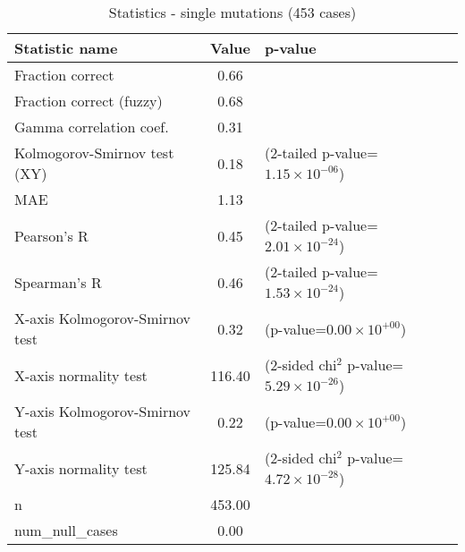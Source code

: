 \documentclass[10pt, letterpaper, oneside, titlepage, landscape]{scrreprt}
\begin{document}
\begin{table}[H]\begin{center}
\begin{tabular}{ l S[table-format=3.2] l}
Statistic name & {Value} & p-value\\
\hline
Fraction correct & 0.66 & \\
Fraction correct (fuzzy) & 0.68 & \\
Gamma correlation coef. & 0.31 & \\
Kolmogorov-Smirnov test (XY) & 0.18 & (2-tailed p-value=$1.15\times10^{-06}$)\\
MAE & 1.13 & \\
Pearson's R & 0.45 & (2-tailed p-value=$2.01\times10^{-24}$)\\
Spearman's R & 0.46 & (2-tailed p-value=$1.53\times10^{-24}$)\\
X-axis Kolmogorov-Smirnov test & 0.32 & (p-value=$0.00\times10^{+00}$)\\
X-axis normality test & 116.40 & (2-sided chi$^{2}$ p-value=$5.29\times10^{-26}$)\\
Y-axis Kolmogorov-Smirnov test & 0.22 & (p-value=$0.00\times10^{+00}$)\\
Y-axis normality test & 125.84 & (2-sided chi$^{2}$ p-value=$4.72\times10^{-28}$)\\
n & 453.00 & \\
num\_null\_cases & 0.00 & \\
\end{tabular}
\caption{Statistics - single mutations (453 cases)}
\end{center}\end{table}
\end{document}
